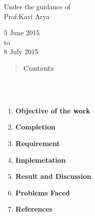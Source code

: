 \documentclass[report]{res}
\begin{document}
\begin{titlepage}
		{ Under the guidance of\\ \large{ Prof.Kavi Arya\\[3cm]}} %
		
		
		{\large 5 June 2015  \\ to \\ 8 July 2015}\\[3cm] %
		
		
		
		
		\vfill %
		
	\end{titlepage}

	
	\begin{quote}
		\centering \textbf{\Huge Contents} \\ 
	\end{quote}
	\qquad \\ \\
	\begin{enumerate}
		\item \textbf{\Large Objective of the work}
		\item \textbf{\Large Completion}
		\item \textbf{\Large Requirement}
		\item \textbf{\Large Implemetation}
		\item \textbf{\Large Result and Discussion}
		\item \textbf{\Large Problems Faced}
		\item \textbf{\Large References}
	\end{enumerate}
	
\end{document}
